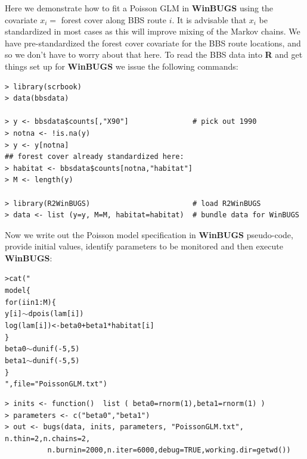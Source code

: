 Here we demonstrate how to fit a Poisson GLM in {\bf WinBUGS} using the
covariate $x_{i} =$ forest cover along BBS route $i$. It is advisable that $x_i$ be
standardized in most cases as this will improve mixing of the Markov
chains. We have pre-standardized the forest cover covariate for the
BBS route locations,
 and so we don't have to worry about that
here.  To read the BBS data into {\bf R} and get things set up for
{\bf WinBUGS}
we issue the following commands:
{\small
\begin{verbatim}
> library(scrbook)
> data(bbsdata)

> y <- bbsdata$counts[,"X90"]               # pick out 1990
> notna <- !is.na(y)
> y <- y[notna]
## forest cover already standardized here:
> habitat <- bbsdata$counts[notna,"habitat"]
> M <- length(y)

> library(R2WinBUGS)                        # load R2WinBUGS
> data <- list (y=y, M=M, habitat=habitat)  # bundle data for WinBUGS
\end{verbatim}
}
Now we write out the Poisson model specification in {\bf WinBUGS}
pseudo-code, provide initial values, identify parameters to be
monitored and then execute {\bf WinBUGS}:
{\small
\begin{alltt}
> cat("
model\{
    for (i in 1:M)\{
      y[i] \(\sim\) dpois(lam[i])
      log(lam[i]) <- beta0+beta1*habitat[i]
     \}
 beta0 \(\sim\) dunif(-5,5)
 beta1 \(\sim\) dunif(-5,5)
\}
",file="PoissonGLM.txt")
\end{alltt}
}
{\small
\begin{verbatim} 
> inits <- function()  list ( beta0=rnorm(1),beta1=rnorm(1) )
> parameters <- c("beta0","beta1")
> out <- bugs(data, inits, parameters, "PoissonGLM.txt", n.thin=2,n.chains=2,
          n.burnin=2000,n.iter=6000,debug=TRUE,working.dir=getwd())
\end{verbatim}
}


